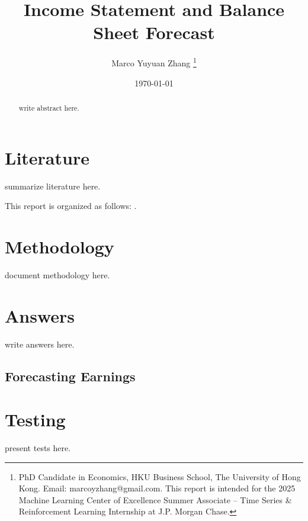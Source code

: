 \documentclass[12pt]{article}
\title{Income Statement and Balance Sheet Forecast}
\author{Marco Yuyuan Zhang  \thanks{PhD Candidate in Economics, HKU Business School, The University of Hong Kong. Email: marcoyzhang@gmail.com. This report is intended for the 2025 Machine Learning Center of Excellence Summer Associate – Time Series \& Reinforcement Learning Internship at J.P. Morgan Chase.}}
\date{\today}
\numberwithin{equation}{section}
\begin{document}
\maketitle
	
\begin{abstract}
	write abstract here.
\end{abstract}

\pagebreak

\section{Literature}
summarize literature here.

This report is organized as follows: .

\section{Methodology}
document methodology here.

\section{Answers}
write answers here.
\subsection*{Forecasting Earnings}


\section{Testing}
present tests here.
\end{document}

